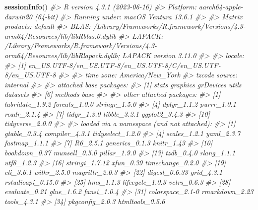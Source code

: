 \documentclass[
]{book}
\newenvironment{Shaded}{\begin{snugshade}}{\end{snugshade}}
\newcommand{\CommentTok}[1]{\textcolor[rgb]{0.56,0.35,0.01}{\textit{#1}}}
\newcommand{\FunctionTok}[1]{\textcolor[rgb]{0.13,0.29,0.53}{\textbf{#1}}}
\newcommand{\NormalTok}[1]{#1}
\begin{document}
\begin{Shaded}
\begin{Highlighting}[]
\FunctionTok{sessionInfo}\NormalTok{()}
\CommentTok{\#\textgreater{} R version 4.3.1 (2023{-}06{-}16)}
\CommentTok{\#\textgreater{} Platform: aarch64{-}apple{-}darwin20 (64{-}bit)}
\CommentTok{\#\textgreater{} Running under: macOS Ventura 13.6.1}
\CommentTok{\#\textgreater{} }
\CommentTok{\#\textgreater{} Matrix products: default}
\CommentTok{\#\textgreater{} BLAS:   /Library/Frameworks/R.framework/Versions/4.3{-}arm64/Resources/lib/libRblas.0.dylib }
\CommentTok{\#\textgreater{} LAPACK: /Library/Frameworks/R.framework/Versions/4.3{-}arm64/Resources/lib/libRlapack.dylib;  LAPACK version 3.11.0}
\CommentTok{\#\textgreater{} }
\CommentTok{\#\textgreater{} locale:}
\CommentTok{\#\textgreater{} [1] en\_US.UTF{-}8/en\_US.UTF{-}8/en\_US.UTF{-}8/C/en\_US.UTF{-}8/en\_US.UTF{-}8}
\CommentTok{\#\textgreater{} }
\CommentTok{\#\textgreater{} time zone: America/New\_York}
\CommentTok{\#\textgreater{} tzcode source: internal}
\CommentTok{\#\textgreater{} }
\CommentTok{\#\textgreater{} attached base packages:}
\CommentTok{\#\textgreater{} [1] stats     graphics  grDevices utils     datasets }
\CommentTok{\#\textgreater{} [6] methods   base     }
\CommentTok{\#\textgreater{} }
\CommentTok{\#\textgreater{} other attached packages:}
\CommentTok{\#\textgreater{}  [1] lubridate\_1.9.2 forcats\_1.0.0   stringr\_1.5.0  }
\CommentTok{\#\textgreater{}  [4] dplyr\_1.1.2     purrr\_1.0.1     readr\_2.1.4    }
\CommentTok{\#\textgreater{}  [7] tidyr\_1.3.0     tibble\_3.2.1    ggplot2\_3.4.3  }
\CommentTok{\#\textgreater{} [10] tidyverse\_2.0.0}
\CommentTok{\#\textgreater{} }
\CommentTok{\#\textgreater{} loaded via a namespace (and not attached):}
\CommentTok{\#\textgreater{}  [1] gtable\_0.3.4      compiler\_4.3.1    tidyselect\_1.2.0 }
\CommentTok{\#\textgreater{}  [4] scales\_1.2.1      yaml\_2.3.7        fastmap\_1.1.1    }
\CommentTok{\#\textgreater{}  [7] R6\_2.5.1          generics\_0.1.3    knitr\_1.43       }
\CommentTok{\#\textgreater{} [10] bookdown\_0.37     munsell\_0.5.0     pillar\_1.9.0     }
\CommentTok{\#\textgreater{} [13] tzdb\_0.4.0        rlang\_1.1.1       utf8\_1.2.3       }
\CommentTok{\#\textgreater{} [16] stringi\_1.7.12    xfun\_0.39         timechange\_0.2.0 }
\CommentTok{\#\textgreater{} [19] cli\_3.6.1         withr\_2.5.0       magrittr\_2.0.3   }
\CommentTok{\#\textgreater{} [22] digest\_0.6.33     grid\_4.3.1        rstudioapi\_0.15.0}
\CommentTok{\#\textgreater{} [25] hms\_1.1.3         lifecycle\_1.0.3   vctrs\_0.6.3      }
\CommentTok{\#\textgreater{} [28] evaluate\_0.21     glue\_1.6.2        fansi\_1.0.4      }
\CommentTok{\#\textgreater{} [31] colorspace\_2.1{-}0  rmarkdown\_2.23    tools\_4.3.1      }
\CommentTok{\#\textgreater{} [34] pkgconfig\_2.0.3   htmltools\_0.5.6}
\end{Highlighting}
\end{Shaded}
\end{document}
